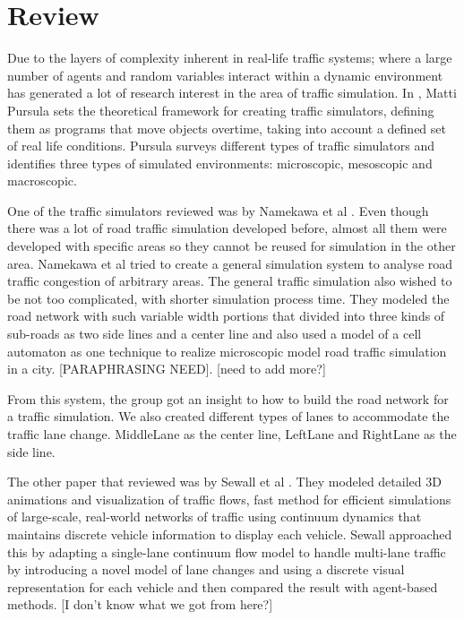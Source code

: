 \documentclass[11pt]{article}
\begin{document}
\section{Review}

Due to the layers of complexity inherent in real-life traffic systems; where a large number of agents and random variables interact within a dynamic environment has generated a lot of research interest in the area of traffic simulation. In \cite{Pursula}, Matti Pursula sets the theoretical framework for creating traffic simulators, defining them as programs that move objects overtime, taking into account a defined set of real life conditions. Pursula surveys different types of traffic simulators and identifies three types of simulated environments: microscopic, mesoscopic and macroscopic.


One of the traffic simulators reviewed was by Namekawa et al \cite{NameUeda05}. Even though there was a lot of road traffic simulation developed before, almost all them were developed with specific areas so they cannot be reused for simulation in the other area. Namekawa et al tried to create a general simulation system to analyse road traffic congestion of arbitrary areas. The general traffic simulation also wished to be not too complicated, with shorter simulation process time. They modeled the road network with such variable width portions that divided into three kinds of sub-roads as two side lines and a center line and also used a model of a cell automaton as one technique to realize microscopic model road traffic simulation in a city. [PARAPHRASING NEED]. [need to add more?]

From this system, the group got an insight to how to build the road network for a traffic simulation.  We also created different types of lanes to accommodate the traffic lane change. MiddleLane as the center line, LeftLane and RightLane as the side line. 

The other paper that reviewed was by Sewall et al \cite{SewWilMer10}. They modeled detailed 3D animations and visualization of traffic flows, fast method for efficient simulations of large-scale, real-world networks of traffic using continuum dynamics that maintains discrete vehicle information to display each vehicle.
Sewall approached this by adapting a single-lane continuum flow model to handle multi-lane traffic by introducing a novel model of lane changes and using a discrete visual representation for each vehicle and then compared the result with agent-based methods. [I don't know what we got from here?]
\end{document}
